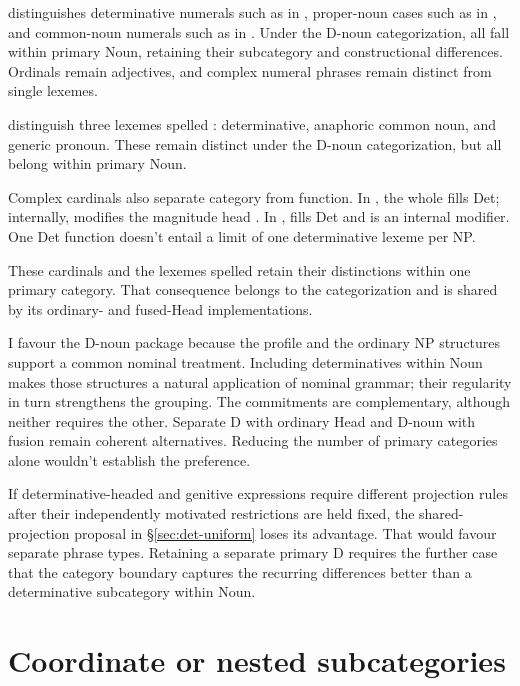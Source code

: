 \documentclass[12pt]{article}
\begin{document}
\textcite{reynolds2026numerals} distinguishes determinative numerals such as  in , proper-noun cases such as  in , and common-noun numerals such as  in . Under the D-noun categorization, all fall within primary Noun, retaining their subcategory and constructional differences. Ordinals remain adjectives, and complex numeral phrases remain distinct from single lexemes.

\textcite[797--798]{payne2013anaphoric} distinguish three lexemes spelled : determinative, anaphoric common noun, and generic pronoun. These remain distinct under the D-noun categorization, but all belong within primary Noun.

Complex cardinals also separate category from function. In , the whole  fills Det; internally,  modifies the magnitude head  \citep[§4]{reynolds2026numerals}. In ,  fills Det and  is an internal modifier. One Det function doesn't entail a limit of one determinative lexeme per NP.

These cardinals and the lexemes spelled  retain their distinctions within one primary category. That consequence belongs to the categorization and is shared by its ordinary- and fused-Head implementations.

I favour the D-noun package because the profile and the ordinary NP structures support a common nominal treatment. Including determinatives within Noun makes those structures a natural application of nominal grammar; their regularity in turn strengthens the grouping. The commitments are complementary, although neither requires the other. Separate D with ordinary Head and D-noun with fusion remain coherent alternatives. Reducing the number of primary categories alone wouldn't establish the preference.

If determinative-headed and genitive expressions require different projection rules after their independently motivated restrictions are held fixed, the shared-projection proposal in §\ref{sec:det-uniform} loses its advantage. That would favour separate phrase types. Retaining a separate primary D requires the further case that the category boundary captures the recurring differences better than a determinative subcategory within Noun.

\section{Coordinate or nested subcategories}\label{sec:inheritance}
\end{document}
